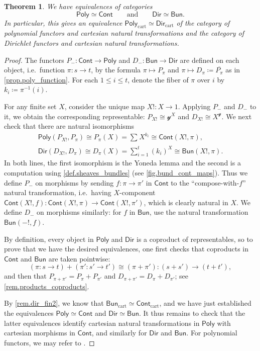 \documentclass[11pt, article, one side]{memoir}
\theoremstyle{theorem}
\newtheorem{theorem}[section]{Theorem}
\theoremstyle{definition}
\theoremstyle{remark}
\newcommand{\Cat}[1]{\mathsf{#1}}%
\newcommand{\inv}{^{-1}}
\newcommand{\cont}{\Cat{Cont}}
\newcommand{\bun}{\Cat{Bun}}
\newcommand{\yon}{\mathcal{y}}
\newcommand{\poly}{\Cat{Poly}}
\newcommand{\dir}{\Cat{Dir}}
\newcommand{\qqand}{\qquad\text{and}\qquad}
\begin{document}
\begin{theorem}\label{thm.equivs}
We have equivalences of categories
\[
\poly\simeq\cont
\qqand
\dir\simeq\bun.
\]
In particular, this gives an equivalence $\poly_{\text{cart}} \simeq \dir_{\text{cart}}$ of the category of polynomial functors and cartesian natural transformations and the category of Dirichlet functors and cartesian natural transformations.
\end{theorem}
\begin{proof}
The functors $P_-\colon\cont\to\poly$ and $D_-\colon\bun\to\dir$ are defined on each object, i.e.\ function $\pi\colon s\to t$, by the formula $\pi\mapsto P_\pi$ and $\pi\mapsto D_\pi\coloneqq\overline{P_\pi}$ as in \cref{prop.poly_function}. For each $1\leq i\leq t$, denote the fiber of $\pi$ over $i$ by $k_i\coloneqq\pi\inv(i)$.

For any finite set $X$, consider the unique map $X!\colon X\to 1$. Applying $P_-$ and $D_-$ to it, we obtain the corresponding representable: $P_{X!}\cong\yon^X$ and $D_{X!}\cong X^\yon$. We next check that there are natural isomorphisms
 \begin{gather}\nonumber
  \poly(P_{X!},P_\pi)\cong 
  P_\pi(X)=
  \sum_{}X^{k_i}\cong
  \cont(X!, \pi),
  \\\label{eqn.dir_bund}
  \dir(D_{X!}, D_\pi)\cong 
  D_\pi(X)=
  \sum_{i=1}^{t}(k_i)^X\cong
  \bun(X!, \pi).
\end{gather}
In both lines, the first isomorphism is the Yoneda lemma and the second is a computation using \cref{def.sheaves_bundles} (see \cref{fig.bund_cont_maps}). Thus we define $P_-$ on morphisms by sending $f\colon\pi\to\pi'$ in $\cont$ to the ``compose-with-$f$'' natural transformation, i.e.\ having $X$-component $\cont(X!,f)\colon\cont(X!,\pi)\to\cont(X!,\pi')$, which is clearly natural in $X$. We define $D_-$ on morphisms similarly: for $f$ in $\bun$, use the natural transformation $\bun(-!,f)$.

By definition, every object in $\poly$ and $\dir$ is a coproduct of representables, so to prove that we have the desired equivalences, one first checks that coproducts in $\cont$ and $\bun$ are taken pointwise:
\[
(\pi\colon s\to t)+(\pi'\colon s'\to t')\cong(\pi+\pi')\colon (s+s')\to (t+t'),
\]
and then that $P_{\pi+\pi'}=P_\pi+P_{\pi'}$ and $D_{\pi+\pi'}=D_\pi+D_{\pi'}$; see \cref{rem.products_coproducts}.

By \cref{rem.dir_fin2}, we know that $\bun_{\text{cart}} \simeq \cont_{\text{cart}}$, and we have just established the equivalences $\poly \simeq \cont$ and $\dir \simeq \bun$. It thus remains to check that the latter equivalences identify cartesian natural transformations in $\poly$ with cartesian morphisms in $\cont$, and similarly for $\dir$ and $\bun$. For polynomial functors, we may refer to \cite[Section 2]{GK:Polynomial.Functors}.


\end{proof}
\end{document}

